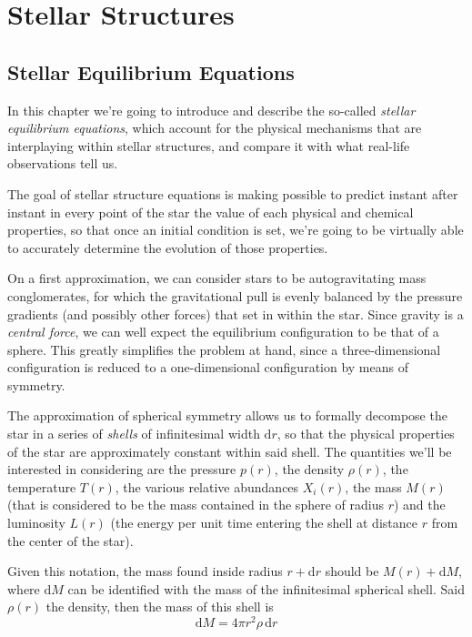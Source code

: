 \chapter{Stellar Structures}\label{ch:ii}

\section{Stellar Equilibrium Equations}

In this chapter we're going to introduce and describe the so-called \emph{stellar equilibrium equations}, which account for the physical mechanisms that are interplaying within stellar structures, and compare it with what real-life observations tell us.
\par The goal of stellar structure equations is making possible to predict instant after instant in every point of the star the value of each physical and chemical properties, so that once an initial condition is set, we're going to be virtually able to accurately determine the evolution of those properties.
\par On a first approximation, we can consider stars to be autogravitating mass conglomerates, for which the gravitational pull is evenly balanced by the pressure gradients (and possibly other forces) that set in within the star. Since gravity is a \emph{central force}, we can well expect the equilibrium configuration to be that of a sphere. This greatly simplifies the problem at hand, since a three-dimensional configuration is reduced to a one-dimensional configuration by means of symmetry.
\par The approximation of spherical symmetry allows us to formally decompose the star in a series of \emph{shells} of infinitesimal width $\text{d}r$, so that the physical properties of the star are approximately constant within said shell. The quantities we'll be interested in considering are the pressure $p(r)$, the density $\rho(r)$, the temperature $T(r)$, the various relative abundances $X_{i}(r)$, the mass $M(r)$ (that is considered to be the mass contained in the sphere of radius $r$) and the luminosity $L(r)$ (the energy per unit time entering the shell at distance $r$ from the center of the star).
\par Given this notation, the mass found inside radius $r+\text{d}r$ should be $M(r)+\text{d}M$, where $\text{d}M$ can be identified with the mass of the infinitesimal spherical shell. Said $\rho(r)$ the density, then the mass of this shell is
\begin{equation*}
	\text{d}M = 4\pi r^{2}\rho\,\text{d}r
\end{equation*}
